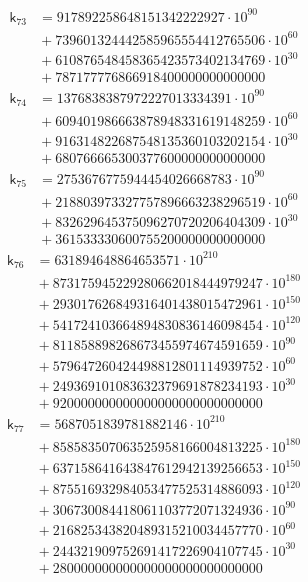 \[
\begin{aligned}
\mathsf{k}_{73} &={} 917892258648151342222927\cdot 10^{90}\\
&{}+ 739601324442585965554412765506\cdot 10^{60}\\
&{}+ 610876548458365423573402134769\cdot 10^{30}\\
&{}+ 787177776866918400000000000000
\end{aligned}
\]
\[
\begin{aligned}
\mathsf{k}_{74} &={} 1376838387972227013334391\cdot 10^{90}\\
&{}+ 609401986663878948331619148259\cdot 10^{60}\\
&{}+ 916314822687548135360103202154\cdot 10^{30}\\
&{}+ 680766665300377600000000000000
\end{aligned}
\]
\[
\begin{aligned}
\mathsf{k}_{75} &={} 2753676775944454026668783\cdot 10^{90}\\
&{}+ 218803973327757896663238296519\cdot 10^{60}\\
&{}+ 832629645375096270720206404309\cdot 10^{30}\\
&{}+ 361533330600755200000000000000
\end{aligned}
\]
\[
\begin{aligned}
\mathsf{k}_{76} &={} 631894648864653571\cdot 10^{210}\\
&{}+ 873175945229280662018444979247\cdot 10^{180}\\
&{}+ 293017626849316401438015472961\cdot 10^{150}\\
&{}+ 541724103664894830836146098454\cdot 10^{120}\\
&{}+ 811858898268673455974674591659\cdot 10^{90}\\
&{}+ 579647260424498812801114939752\cdot 10^{60}\\
&{}+ 249369101083632379691878234193\cdot 10^{30}\\
&{}+ 920000000000000000000000000000
\end{aligned}
\]
\[
\begin{aligned}
\mathsf{k}_{77} &={} 5687051839781882146\cdot 10^{210}\\
&{}+ 858583507063525958166004813225\cdot 10^{180}\\
&{}+ 637158641643847612942139256653\cdot 10^{150}\\
&{}+ 875516932984053477525314886093\cdot 10^{120}\\
&{}+ 306730084418061103772071324936\cdot 10^{90}\\
&{}+ 216825343820489315210034457770\cdot 10^{60}\\
&{}+ 244321909752691417226904107745\cdot 10^{30}\\
&{}+ 280000000000000000000000000000
\end{aligned}
\]
